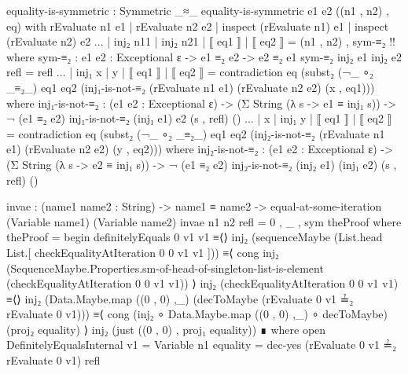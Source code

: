 \documentclass{report}
\begin{document}
\begin{code}
  equality-is-symmetric : Symmetric _≈_
  equality-is-symmetric {e1} {e2} ((n1 , n2) , eq) with rEvaluate n1 e1
                                                      | rEvaluate n2 e2
                                                      | inspect (rEvaluate n1) e1
                                                      | inspect (rEvaluate n2) e2
  ... | inj₂ n11 | inj₂ n21 | ⟦ eq1 ⟧ | ⟦ eq2 ⟧ =
    (n1 , n2) , sym-≡₂ {!!}
    where
    sym-≡₂ : {e1 e2 : Exceptional ε} ->
             e1 ≡₂ e2 ->
             e2 ≡₂ e1
    sym-≡₂ {inj₂ e1} {inj₂ e2} refl = refl
  ... | inj₁ x | y | ⟦ eq1 ⟧ | ⟦ eq2 ⟧ =
    contradiction eq (subst₂ (¬_ ∘₂ _≡₂_)
                             eq1
                             eq2
                             (inj₁-is-not-≡₂ (rEvaluate n1 e1)
                                             (rEvaluate n2 e2)
                                             (x , eq1)))
    where
    inj₁-is-not-≡₂ :
      (e1 e2 : Exceptional ε) ->
      (Σ String (λ s -> e1 ≡ inj₁ s)) ->
      ¬ (e1 ≡₂ e2)
    inj₁-is-not-≡₂ (inj₁ e1) e2 (s , refl) ()
  ... | x | inj₁ y | ⟦ eq1 ⟧ | ⟦ eq2 ⟧ =
    contradiction eq (subst₂ (¬_ ∘₂ _≡₂_)
                             eq1
                             eq2
                             (inj₂-is-not-≡₂ (rEvaluate n1 e1)
                                             (rEvaluate n2 e2)
                                             (y , eq2)))
    where
    inj₂-is-not-≡₂ :
      (e1 e2 : Exceptional ε) ->
      (Σ String (λ s -> e2 ≡ inj₁ s)) ->
      ¬ (e1 ≡₂ e2)
    inj₂-is-not-≡₂ (inj₂ e1) (inj₁ e2) (s , refl) ()

  invae : (name1 name2 : String) ->
          name1 ≡ name2 ->
          equal-at-some-iteration (Variable name1) (Variable name2)
  invae n1 n2 refl = 0 , _ , sym theProof
    where
    theProof = begin
      definitelyEquals 0 v1 v1
        ≡⟨⟩
      inj₂ (sequenceMaybe (List.head List.[ checkEqualityAtIteration 0 0 v1 v1 ]))
        ≡⟨ cong inj₂
                (SequenceMaybe.Properties.sm-of-head-of-singleton-list-is-element
                  (checkEqualityAtIteration 0 0 v1 v1)) ⟩
      inj₂ (checkEqualityAtIteration 0 0 v1 v1)
        ≡⟨⟩
      inj₂ (Data.Maybe.map ((0 , 0) ,_)
                           (decToMaybe (rEvaluate 0 v1 ≟₂ rEvaluate 0 v1)))
        ≡⟨ cong (inj₂ ∘ Data.Maybe.map ((0 , 0) ,_) ∘ decToMaybe)
                (proj₂ equality) ⟩
      inj₂ (just ((0 , 0) , proj₁ equality)) ∎
      where
      open DefinitelyEqualsInternal
      v1 = Variable n1
      equality = dec-yes (rEvaluate 0 v1 ≟₂ rEvaluate 0 v1) refl
\end{code}
\end{document}
